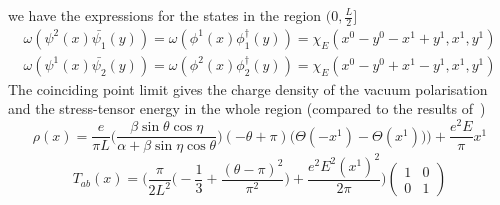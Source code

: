 we have the expressions for the states in the region $(0, \frac{L}{2}]$
\begin{equation*}
\begin{split}
\omega(\psi^2(x) \bar{\psi_1}(y)) = 
\omega(\phi^1(x) \phi^\dagger_1(y)) = \chi_E(x^0 - y^0 - x^1 + y^1, x^1, y^1) \\
 \omega(\psi^1(x) \bar{\psi_2}(y)) = 
\omega(\phi^2(x) \phi^\dagger_2(y)) = \chi_E(x^0 - y^0 + x^1 - y^1, x^1, y^1)
\end{split}
\end{equation*}
The coinciding point limit gives the charge density of the vacuum polarisation and the stress-tensor energy in the whole region (compared to the results of~\cite{Zahn2015})
\begin{equation}
\rho(x) = \frac{e}{\pi L}\Big( \frac{\beta \sin \theta \cos \eta}{\alpha + \beta \sin \eta \cos \theta}\Big) (-\theta + \pi)
\Big(\Theta(- x^1) - \Theta(x^1))\Big) + \frac{e^2 E}{\pi} x^1
\end{equation}
\begin{equation}
T_{ab}(x) = 
\bigg( \frac{\pi}{2L^2}\big( -\frac{1}{3} + \frac{(\theta - \pi)^2}{\pi^2}\big) + \frac{e^2E^2(x^1)^2}{2 \pi} \bigg)
\begin{pmatrix}
1 & 0 \\ 0 & 1
\end{pmatrix}
\end{equation}
